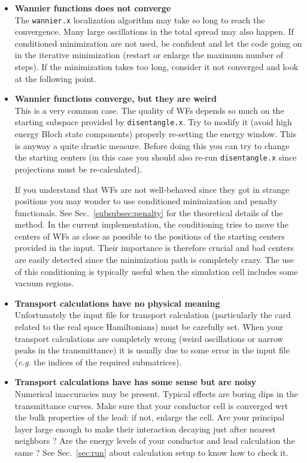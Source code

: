 \begin{itemize}
\item   {\bf Wannier functions does not converge} \\
        The {\tt wannier.x} localization algorithm may take so long to reach the
        convergence. Many large oscillations in the total spread may also happen.
        If conditioned minimization are not used, be confident and let the code
        going on in the iterative minimization (restart or enlarge the maximum number
        of steps). If the minimization takes too long, consider it not converged and
        look at the following point.

\item   {\bf Wannier functions converge, but they are weird } \\
        This is a very common case. The quality of WFs depends so much on the starting
        subspace provided by {\tt disentangle.x}. Try to modify it (avoid high
        energy Bloch state components) properly re-setting the energy window.
        This is anyway a quite drastic measure. Before doing this you can try to
        change the starting centers (in this case you should also re-run
        {\tt disentangle.x} since projections must be re-calculated).

        If you understand that WFs are not well-behaved since they got in strange
        positions you may wonder to use conditioned minimization and penalty functionals.
        See Sec.~\ref{subsubsec:penalty} for the theoretical details of the method.
        In the current implementation, the conditioning tries to move the centers of
        WFs as close as possible to the positions of the starting centers provided
        in the input. Their importance is therefore crucial and bad centers are
        easily detected since the minimization path is completely crazy.
        The use of this conditioning is typically useful when the simulation cell
        includes some vacuum regions.

\item   {\bf Transport calculations have no physical meaning } \\
        Unfortunately the input file for transport calculation (particularly the
        card related to the real space Hamiltonians) must be carefully set.
        When your transport calculations are completely wrong (weird oscillations or
        narrow peaks in the transmittance) it is usually due to some error in
        the input file ({\it e.g.} the indices of the required submatrices).

\item   {\bf Transport calculations have has some sense but are noisy} \\
        Numerical inaccuracies may be present. Typical effects are boring dips
        in the transmittance curves. Make sure that your conductor
        cell is converged wrt the bulk properties of the lead: if not, enlarge the cell.
        Are your principal layer large enough to make their interaction decaying
        just after nearest neighbors ?
        Are the energy levels of your conductor and lead calculation the same ?
        See Sec.~\ref{sec:run} about calculation setup to know how to check it.

\end{itemize}
